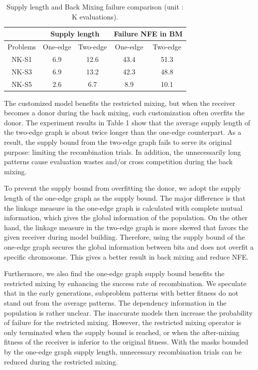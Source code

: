 \documentclass{sig-alternate-05-2015}
\begin{document}
\begin{table}[t!]
\begin{tabular}{|c|c|c|c|c|}
\hline
 &
\multicolumn{2}{c|}{Supply length} &
\multicolumn{2}{c|}{Failure NFE in BM} \\
\hline
Problems  & One-edge & Two-edge & One-edge & Two-edge \\\hline
NK-S1 &  6.9 &12.6  &43.4 & 51.3 \\\hline
NK-S3 & 6.9  & 13.2  &42.3 & 48.8 \\\hline
NK-S5 & 2.6  &6.7  &  8.9& 10.1 \\\hline

\end{tabular}
\caption{Supply length and Back Mixing failure comparison (unit : K evaluations).}
\end{table}


The customized model benefits the restricted mixing, but when the receiver becomes a donor during the back mixing, such customization often overfits the donor. The experiment results in Table 1 show that the average supply length of the two-edge graph is about twice longer than the one-edge counterpart. As a result, the supply bound from the two-edge graph fails to serve its original purpose: limiting the recombination trials. In addition, the unnecessarily long patterns cause evaluation wastes and/or cross competition during the back mixing. 


To prevent the supply bound from overfitting the donor, we adopt the supply length of the one-edge graph as the supply bound. The major difference is that the linkage measure in the one-edge graph is calculated with complete mutual information, which gives the global information of the population. On the other hand, the linkage measure in the two-edge graph is more skewed that favors the given receiver during model building. Therefore, using the supply bound of the one-edge graph secures the global information between bits and does not overfit a specific chromosome. This gives a better result in back mixing and reduce NFE.


Furthermore, we also find the one-edge graph supply bound benefits the restricted mixing by enhancing the success rate of recombination. We speculate that in the early generations, subproblem patterns with better fitness do not stand out from the average patterns. The dependency information in the population is rather unclear. The inaccurate models then increase the probability of failure for the restricted mixing. However, the restricted mixing operator is only terminated when the supply bound is reached, or when the after-mixing fitness of the receiver is inferior to the original fitness. With the masks bounded by the one-edge graph supply length, unnecessary recombination trials can be reduced during the restricted mixing. 
\end{document}
